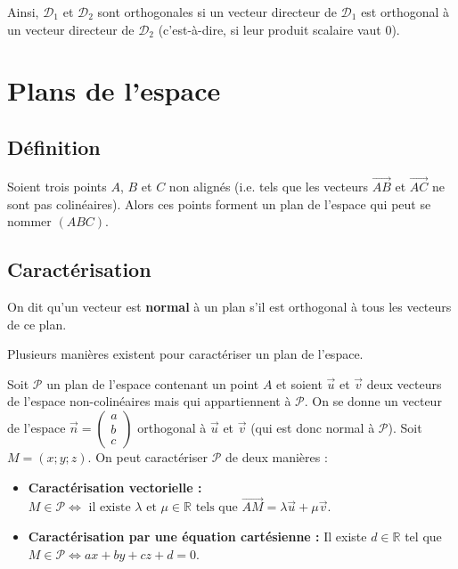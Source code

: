 	\begin{tip}
		Ainsi, $\mathcal{D}_1$ et $\mathcal{D}_2$ sont orthogonales si un vecteur directeur de $\mathcal{D}_1$ est orthogonal à un vecteur directeur de $\mathcal{D}_2$ (c'est-à-dire, si leur produit scalaire vaut $0$).
	\end{tip}
	
	\section{Plans de l'espace}
	
	\subsection{Définition}
	
	Soient trois points $A$, $B$ et $C$ non alignés (i.e. tels que les vecteurs $\overrightarrow{AB}$ et $\overrightarrow{AC}$ ne sont pas colinéaires). Alors ces points forment un plan de l'espace qui peut se nommer $(ABC)$.
	
	\subsection{Caractérisation}
	
	\begin{formula}
		On dit qu'un vecteur est \textbf{normal} à un plan s'il est orthogonal à tous les vecteurs de ce plan.
	\end{formula}
	
	Plusieurs manières existent pour caractériser un plan de l'espace.
	
	\begin{formula}
		Soit $\mathcal{P}$ un plan de l'espace contenant un point $A$ et soient $\overrightarrow{u}$ et $\overrightarrow{v}$ deux vecteurs de l'espace non-colinéaires mais qui appartiennent à $\mathcal{P}$.
		\newpar
		On se donne un vecteur de l'espace $\overrightarrow{n} = \begin{pmatrix} a \\ b \\ c \end{pmatrix}$ orthogonal à $\overrightarrow{u}$ et $\overrightarrow{v}$ (qui est donc normal à $\mathcal{P}$).
		\newpar
		Soit $M = (x; y; z)$. On peut caractériser $\mathcal{P}$ de deux manières :
		\begin{itemize}
			\item \textbf{Caractérisation vectorielle :}
			\newline
			$M \in \mathcal{P} \iff \text{ il existe } \lambda \text{ et } \mu \in \mathbb{R} \text{ tels que } \overrightarrow{AM} = \lambda \overrightarrow{u} + \mu \overrightarrow{v}$.
			\item \textbf{Caractérisation par une équation cartésienne :}
			\newline
			Il existe $d \in \mathbb{R}$ tel que $M \in \mathcal{P} \iff ax + by + cz + d = 0$.
		\end{itemize}
	\end{formula}
	

